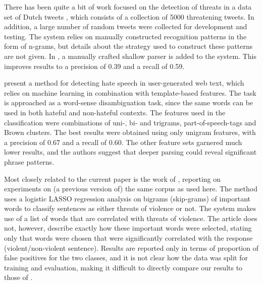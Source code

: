 \documentclass[11pt,letterpaper]{article}
\newcommand{\tovs}{threats of violence}
\begin{document}
There has been quite a bit of work focused on the detection of threats in a data set of Dutch tweets \cite{nellngram2013,nellshallow2013}, which consists of a collection of 5000 threatening tweets. %
In addition, a large number of random tweets were collected for development and testing. %
The system relies on manually constructed recognition patterns in the form of n-grams, 
but details about the strategy used to construct these patterns are not given. %
In , a manually crafted shallow parser is added to the system. This improves results to a precision of 0.39 and a recall of 0.59.

 present a method for detecting hate speech in user-generated web text, which relies on machine learning in combination with template-based features. The task is approached as a word-sense disambiguation task, since the same words can be used in both hateful and non-hateful contexts. The features used in the classification were combinations of uni-, bi- and trigrams, part-of-speech-tags and Brown clusters.  The best results were obtained using only unigram features, with a precision of 0.67 and a recall of 0.60. The other feature sets garnered much lower results, and the authors suggest that deeper parsing could reveal significant phrase patterns.

Most closely related to the current paper is the work of , reporting on experiments on (a previous version of) the same corpus as used here. The method uses a logistic LASSO regression analysis on bigrams (skip-grams) of important words to classify sentences as either \tovs{} or not.  The system makes use of a list of words that are correlated with threats of violence. The article does not, however, describe exactly how these important words were selected, stating only that words were chosen that were significantly correlated with the response (violent/non-violent sentence). Results are reported only in terms of proportion of false positives for the two classes, and it is not clear how the data was split for training and evaluation, making it difficult to directly compare our results to those of .
\end{document}
